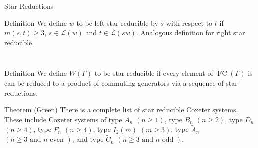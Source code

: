 \documentclass{beamer}
\DeclareMathOperator{\FC}{FC}
\newcommand{\LD}{\mathcal{L}}
\newcommand\heapblock[4]{\fill[fill=#4, fill opacity=0.35, draw=#4, line width=1.1pt, rounded corners,shift={(\xxaxis:#1)},shift={(\yyaxis:#2)}] (-1,-1) rectangle (1,1);\node at (#1,#2) {\footnotesize $#3$};}
\newcommand\dheapblock[4]{\draw[dotted, draw=#4, line width=1.1pt, rounded corners,shift={(\xxaxis:#1)},shift={(\yyaxis:#2)}] (-1,-1) rectangle (1,1);\node at (#1,#2) {\footnotesize $#3$};}
\newcommand\xxaxis{0}
\newcommand\yyaxis{90}
\begin{document}
\begin{frame}{Star Reductions}
\begin{block}{Definition}
	We define $w$ to be \alert{left star reducible by $s$ with respect to $t$} if $m(s,t) \geq 3$, $s \in \LD(w)$ and $ t \in \LD(sw)$. Analogous definition for \alert{right star reducible}.
\end{block}

\pause

\begin{columns}
\begin{column}{0.4\textwidth}
\begin{figure} \centering
{}
\end{figure}	
\end{column}
	
\begin{column}{0.4\textwidth}	
\begin{figure}
\end{figure}
\end{column}
\end{columns}

\pause

\begin{block}{Definition}
	We define $W(\Gamma)$ to be \alert{star reducible} if every element of $\FC(\Gamma)$ is can be reduced to a product of commuting generators via a sequence of star reductions.
\end{block}

\pause

\begin{block}{Theorem (Green)}
	There is a complete list of star reducible Coxeter systems. These include Coxeter systems of type $A_n$ $(n \geq 1)$, type $B_n$ $(n \geq 2)$, type $D_n$ $(n \geq 4)$, type $F_n$ $(n \geq 4)$, type $I_2(m)$ $(m \geq 3)$, type $\widetilde{A}_{n}$ $(n \geq 3 \text{ and } n \text{ even })$, and type $\widetilde{C}_{n}$ $(n\geq 3 \text{ and } n \text{ odd })$.
\end{block}
	
\end{frame}
\end{document}
